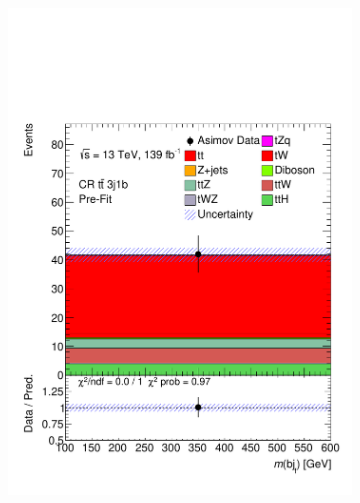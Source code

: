 \begin{figure}[!h]
\begin{subfigure}[b]{0.33\linewidth}
    \includegraphics[width=\textwidth]{ubonn-thesis/Chapters/Chapters_07/Figure/Asmiov/CR_3j1b.pdf} 
    \caption{}
  \end{subfigure}%
  \newline
  \hspace*{-1.5cm}
  \begin{subfigure}[b]{0.33\linewidth}

\end{subfigure}
\end{figure}
